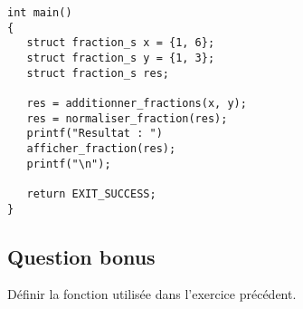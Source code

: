 \begin{correction}
\begin{verbatim}
int main()
{
   struct fraction_s x = {1, 6};
   struct fraction_s y = {1, 3};
   struct fraction_s res;
   
   res = additionner_fractions(x, y);
   res = normaliser_fraction(res);
   printf("Resultat : ")
   afficher_fraction(res);
   printf("\n");

   return EXIT_SUCCESS;
}
\end{verbatim}

\end{correction}

\subsection*{Question bonus}

Définir la fonction  utilisée dans
l'exercice précédent.
